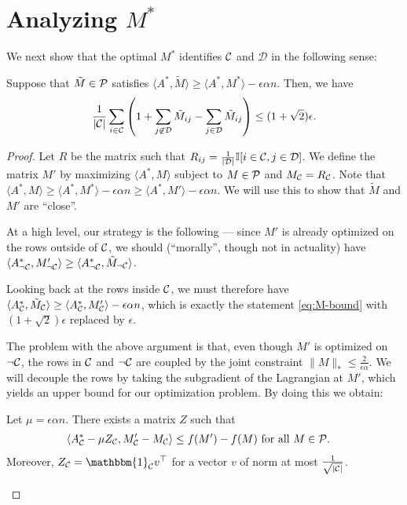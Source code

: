\documentclass[11pt]{article}
\newcommand{\M}{\tilde{M}}
\newcommand{\Aa}{A^*}
\newcommand{\sD}{\mathcal{D}}
\newcommand{\bi}{\mathbbm{1}}
\begin{document}
\section{Analyzing $M^*$}
We next show that the optimal $M^*$ identifies $\mathcal{C}$ and $\sD$ in the following sense:
\begin{proposition}
\label{prop:M-bound}
Suppose that $\M \in \sP$ satisfies $\langle \Aa, \M \rangle \geq \langle \Aa, M^* \rangle - \epsilon \alpha n$. 
Then, we have 
\begin{equation}
\label{eq:M-bound}
\frac{1}{|\sC|} \sum_{i \in \sC} \p{1 + \sum_{j \not\in \sD} \M_{ij} - \sum_{j \in \sD} \M_{ij}} \leq (1+\sqrt{2})\epsilon.
\end{equation}
\end{proposition}
\begin{proof}
Let $R$ be the matrix such that $R_{ij} = \frac{1}{|\sD|}\bI[i \in \sC, j \in \sD]$. 
We define the matrix $M'$ by maximizing $\langle \Aa, M \rangle$ subject to $M \in \mathcal{P}$ and 
$M_{\mathcal{C}} = R_{\mathcal{C}}$. Note that 
$\langle \Aa, M \rangle \geq \langle \Aa, M^* \rangle - \epsilon \alpha n \geq \langle \Aa, M' \rangle - \epsilon \alpha n$. 
We will use this to show that $\M$ and $M'$ are ``close''.

At a high level, our strategy is the following --- since $M'$ is already optimized 
on the rows outside of $\mathcal{C}$, we should (``morally'', though not in actuality) have 
$\langle \Aa_{\neg \sC}, M'_{\neg \sC} \rangle \geq \langle \Aa_{\neg \sC}, \M_{\neg \sC} \rangle$. 

Looking back at the rows inside $\mathcal{C}$, we must therefore have 
$\langle \Aa_{\sC}, \M_{\sC} \rangle \geq \langle \Aa_{\sC}, M'_{\sC} \rangle - \epsilon \alpha n$, 
which is exactly the statement \eqref{eq:M-bound} with $(1+\sqrt{2})\epsilon$ replaced by $\epsilon$.

The problem with the above argument is that, even though $M'$ is optimized on $\neg \mathcal{C}$, the rows in 
$\mathcal{C}$ and $\neg \mathcal{C}$ are coupled by the joint constraint $\|M\|_* \leq \frac{2}{\epsilon\alpha}$. We 
will decouple the rows by taking the subgradient of the Lagrangian at $M'$, which yields an upper bound 
for our optimization problem. By doing this we obtain:

\begin{proposition}
\label{prop:subgradient}
Let $\mu = \epsilon \alpha n$. There exists a matrix $Z$ such that
\begin{align}
\langle \Aa_{\sC} - \mu Z_{\sC}, M'_{\sC} - M_{\sC} \rangle &\leq f(M') - f(M) \text{ for all $M \in \sP$}.
\end{align}
Moreover, $Z_{\sC} = \bi_{\sC}v^{\top}$ for a vector $v$ of norm at most $\frac{1}{\sqrt{|\mathcal{C}|}}$.
\end{proposition}


\end{proof}
\end{document}
